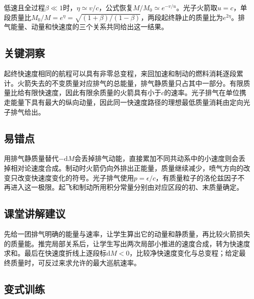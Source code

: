 \documentclass[UTF8,fontset=fandol,a4paper,11pt]{ctexart}
\begin{document}
低速且全过程$\beta\ll1$时，$\eta\simeq v/c$，公式恢复$M/M_0\simeq e^{-v/u}$。光子火箭取$u=c$，单段质量比$M_0/M=e^\eta=\sqrt{(1+\beta)/(1-\beta)}$，两段起终静止的质量比为$e^{2\eta}$。排气能量、动量和快速度的三个关系共同给出这一结果。




\subsection*{关键洞察}

起终快速度相同的航程可以具有非零总变程，来回加速和制动的燃料消耗逐段累计。火箭失去的不变质量对应排气的总能量，排气静质量只占其中一部分。有限质量比给有限快速度，因此有限余质量的火箭具有小于$c$的速率。光子排气在单位携走能量下具有最大的纵向动量，因此同一快速度路径的理想最低质量消耗由定向光子排气给出。



\subsection*{易错点}

用排气静质量替代$-\mathrm dM$会丢掉排气动能，直接累加不同共动系中的小速度则会丢掉相对论速度合成。制动时火箭仍向外排出正能量，质量继续减少，喷气方向的改变只改变快速度变化的符号。光子排气使用$p=\epsilon/c$，有质量粒子的洛伦兹因子不再进入这一极限。起飞和制动所用积分常量分别由对应区段的初、末质量确定。



\subsection*{课堂讲解建议}

先给一团排气明确的能量与速率，让学生算出它的动量和静质量，再比较火箭损失的质量能。推完局部关系后，让学生写出两次局部小推进的速度合成，转为快速度求和。最后在快速度折线上逐段标$\mathrm dM<0$，比较净快速度变化与总变程；给定最终质量时，可反过来求允许的最大巡航速率。



\subsection*{变式训练}
\end{document}
